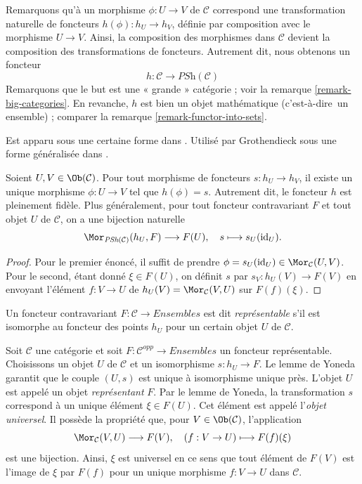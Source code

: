 \noindent
Remarquons qu'à un morphisme $\phi : U \to V$ de $\mathcal{C}$ correspond
une transformation naturelle de foncteurs $h(\phi) : h_U \to h_V$,
définie par composition avec le morphisme $U \to V$. Ainsi,
la composition des morphismes dans $\mathcal{C}$ devient la composition
des transformations de foncteurs. Autrement dit, nous obtenons un foncteur
$$
h :
\mathcal{C}
\longrightarrow
\textit{PSh}(\mathcal{C})
$$
Remarquons que le but est une « grande » catégorie ; voir la
remarque \ref{remark-big-categories}. En revanche,
$h$ est bien un objet mathématique (c'est-à-dire\ un ensemble) ; comparer
la remarque \ref{remark-functor-into-sets}.

\begin{lemma}
\label{lemma-yoneda}
\begin{reference}
Est apparu sous une certaine forme dans \cite{Yoneda-homology}. Utilisé par
Grothendieck sous une forme généralisée dans \cite{Gr-II}.
\end{reference}
Soient $U, V \in \Ob(\mathcal{C})$.
Pour tout morphisme de foncteurs $s : h_U \to h_V$,
il existe un unique morphisme $\phi : U \to V$
tel que $h(\phi) = s$. Autrement dit, le
foncteur $h$ est pleinement fidèle. Plus généralement,
pour tout foncteur contravariant $F$ et tout objet
$U$ de $\mathcal{C}$, on a une bijection naturelle
$$
\Mor_{\textit{PSh}(\mathcal{C})}(h_U, F) \longrightarrow F(U),
\quad
s \longmapsto s_U(\text{id}_U).
$$
\end{lemma}

\begin{proof}
Pour le premier énoncé, il suffit de prendre
$\phi = s_U(\text{id}_U) \in \Mor_\mathcal{C}(U, V)$.
Pour le second, étant donné $\xi \in F(U)$, on définit
$s$ par $s_V : h_U(V) \to F(V)$ en envoyant l'élément $f : V \to U$
de $h_U(V) = \Mor_\mathcal{C}(V, U)$ sur $F(f)(\xi)$.
\end{proof}

\begin{definition}
\label{definition-representable-functor}
Un foncteur contravariant $F : \mathcal{C}\to \textit{Ensembles}$ est dit
{\it représentable} s'il est isomorphe au foncteur des points
$h_U$ pour un certain objet $U$ de $\mathcal{C}$.
\end{definition}

\noindent
Soit $\mathcal{C}$ une catégorie et soit
$F : \mathcal{C}^{opp} \to \textit{Ensembles}$ un foncteur représentable.
Choisissons un objet $U$ de $\mathcal{C}$ et un isomorphisme $s : h_U \to F$.
Le lemme de Yoneda garantit que le couple $(U, s)$
est unique à isomorphisme unique près. L'objet
$U$ est appelé un objet {\it représentant} $F$.
Par le lemme de Yoneda, la transformation $s$ correspond à un unique
élément $\xi \in F(U)$. Cet élément est appelé l'{\it objet universel}.
Il possède la propriété que, pour $V \in \Ob(\mathcal{C})$, l'application
$$
\Mor_\mathcal{C}(V, U) \longrightarrow F(V),\quad
(f : V \to U) \longmapsto F(f)(\xi)
$$
est une bijection. Ainsi, $\xi$ est universel en ce sens que tout élément
de $F(V)$ est l'image de $\xi$ par $F(f)$ pour un unique morphisme
$f : V \to U$ dans $\mathcal{C}$.






